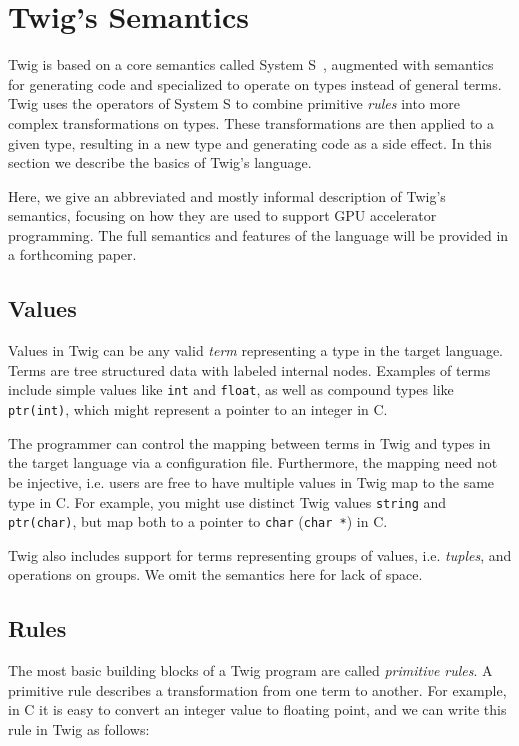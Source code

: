 
\section{Twig's Semantics}
\label{semantics}

Twig is based on a core semantics called System S~\cite{Visser:1998p333},
augmented with semantics for generating code and specialized to operate on types
instead of general terms. Twig uses the operators of System S to combine
primitive \emph{rules} into more complex transformations on types. These
transformations are then applied to a given type, resulting in a new type and
generating code as a side effect. In this section we describe the basics of
Twig's language.

Here, we give an abbreviated and mostly informal description of Twig's
semantics, focusing on how they are used to support GPU accelerator programming.
The full semantics and features of the language will be provided in a
forthcoming paper.

\subsection{Values}

Values in Twig can be any valid \emph{term} representing a type in the target
language. Terms are tree structured data with labeled internal nodes. Examples
of terms include simple values like \texttt{int} and \texttt{float}, as well as
compound types like \texttt{ptr(int)}, which might represent a pointer to an
integer in C.

The programmer can control the mapping between terms in Twig and types in the
target language via a configuration file. Furthermore, the mapping need not be
injective, i.e. users are free to have multiple values in Twig map to the same
type in C. For example, you might use distinct Twig values \texttt{string} and
\texttt{ptr(char)}, but map both to a pointer to \texttt{char} (\texttt{char *})
in C.

Twig also includes support for terms representing groups of values, i.e.
\emph{tuples}, and operations on groups. We omit the semantics here for lack of
space.

\subsection{Rules}

The most basic building blocks of a Twig program are called \emph{primitive
rules}. A primitive rule describes a transformation from one term to another.
For example, in C it is easy to convert an integer value to floating point, and
we can write this rule in Twig as follows:

